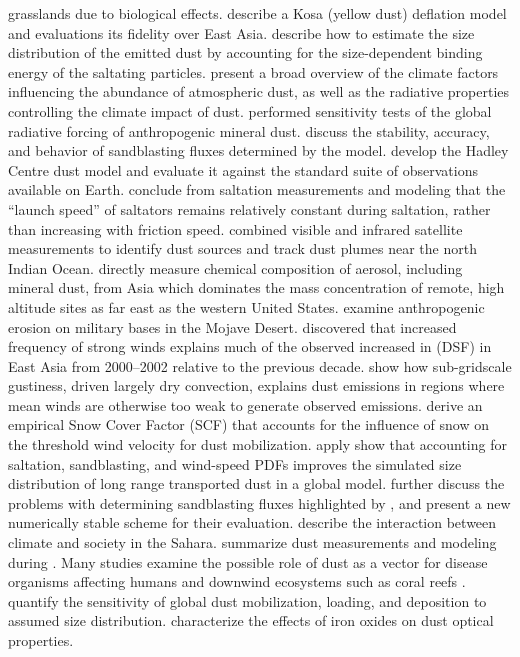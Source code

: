 \documentclass[12pt,twoside]{book}
\begin{document}
grasslands due to biological effects. 
\cite{WUH00} describe a Kosa (yellow dust) deflation model and
evaluations its fidelity over East Asia.
\cite{AlG01} describe how to estimate the size distribution of the
emitted dust by accounting for the size-dependent binding energy of
the saltating particles.
\cite{Ari01} present a broad overview of the climate factors
influencing the abundance of atmospheric dust, as well as the
radiative properties controlling the climate impact of dust.
\cite{MyS01} performed sensitivity tests of the global radiative
forcing of anthropogenic mineral dust.
\cite{GZC02} discuss the stability, accuracy, and behavior of
sandblasting fluxes determined by the \cite{AlG01} model.
\cite{LuV02} develop the Hadley Centre dust model and evaluate it
against the standard suite of observations available on Earth.
\cite{Nam03} conclude from saltation measurements and modeling that
the ``launch speed'' of saltators remains relatively constant during
saltation, rather than increasing with friction speed.
\cite{LeL03} combined visible and infrared satellite measurements to
identify dust sources and track dust plumes near the north Indian
Ocean. 
\cite{Van03} directly measure chemical composition of aerosol,
including mineral dust, from Asia which dominates the mass
concentration of remote, high altitude sites as far east as the
western United States.
\cite{VHS03} examine anthropogenic erosion on military bases in the
Mojave Desert.
\cite{KuM03} discovered that increased frequency of strong winds
explains much of the observed increased in 
 (DSF) in East Asia from 2000--2002 
relative to the previous decade.
\cite{CMT04} show how sub-gridscale gustiness, driven largely dry
convection, explains dust emissions in regions where mean winds
are otherwise too weak to generate observed emissions.
\cite{KuM04} derive an empirical Snow Cover Factor (SCF) that accounts
for the influence of snow on the threshold wind velocity for dust
mobilization. 
\cite{GrZ04} apply show that accounting for saltation, sandblasting, 
and wind-speed PDFs improves the simulated size distribution of long
range transported dust in a global model.
\cite{MSM05} further discuss the problems with determining
sandblasting fluxes highlighted by \cite{GZC02}, and present a new
numerically stable scheme for their evaluation.
\cite{BCD05} describe the interaction between climate and society in
the Sahara.
\cite{AKK06} summarize dust measurements and modeling during 
.
Many studies examine the possible role of dust as a vector for disease
organisms affecting humans \cite[]{ZeT06b} and downwind ecosystems such
as coral reefs \cite[]{SSP00,PBM05}.
\cite{YGH06} quantify the sensitivity of global dust mobilization, 
loading, and deposition to assumed size distribution.
\cite{LSR06} characterize the effects of iron oxides on dust optical properties.
\end{document}
